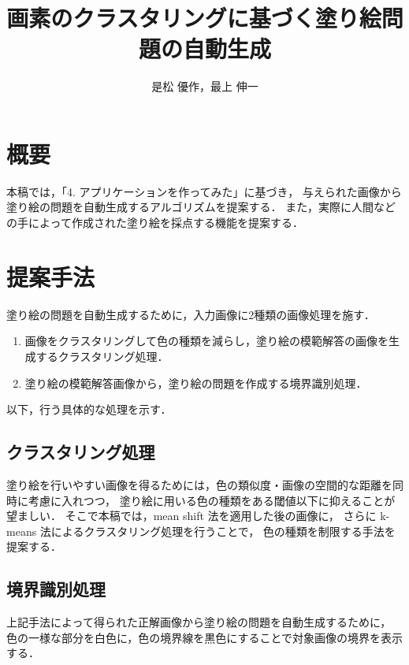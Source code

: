 \documentclass[dvipdfmx]{jsarticle}
\begin{document}
\title{画素のクラスタリングに基づく塗り絵問題の自動生成}
\author{是松 優作，最上 伸一}

\setlength{\baselineskip}{4.4mm}	%
\maketitle
\thispagestyle{empty}
\pagestyle{empty}

\section{概要}
本稿では，「4. アプリケーションを作ってみた」に基づき，
与えられた画像から塗り絵の問題を自動生成するアルゴリズムを提案する．
また，実際に人間などの手によって作成された塗り絵を採点する機能を提案する．

\section{提案手法}

塗り絵の問題を自動生成するために，入力画像に2種類の画像処理を施す．
\begin{enumerate}
\item 画像をクラスタリングして色の種類を減らし，塗り絵の模範解答の画像を生成する{\gtfamily クラスタリング処理}．
\item 塗り絵の模範解答画像から，塗り絵の問題を作成する{\gtfamily 境界識別処理}．
\end{enumerate}
以下，行う具体的な処理を示す．

\subsection{クラスタリング処理}
塗り絵を行いやすい画像を得るためには，色の類似度・画像の空間的な距離を同時に考慮に入れつつ，
塗り絵に用いる色の種類をある閾値以下に抑えることが望ましい．
そこで本稿では，mean shift 法を適用した後の画像に，
さらに k-means 法によるクラスタリング処理を行うことで，
色の種類を制限する手法を提案する．


\subsection{境界識別処理}
上記手法によって得られた正解画像から塗り絵の問題を自動生成するために，
色の一様な部分を白色に，色の境界線を黒色にすることで対象画像の境界を表示する．
\end{document}
